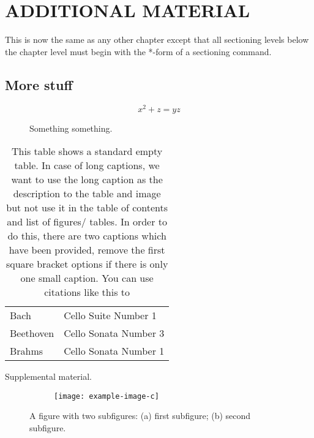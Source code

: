 

\appendixtitle
\appendix



\chapter{ADDITIONAL MATERIAL}
\finishAppendixSetup%

This is now the same as any other chapter except that
all sectioning levels below the chapter level must begin
with the *-form of a sectioning command.

\section*{More stuff}
\begin{equation}
	x^2+z=yz
\end{equation}
\begin{figure}
	\caption{Something something.}
\end{figure}
\begin{table}[h!tb] \centering
	\caption[This table shows a standard non-empty table. Please check the code caption for extended instructions]{This table shows a standard empty table. In case of long captions, we want to use the long caption as the description to the table and image but not use it in the table of contents and list of figures/ tables. In order to do this, there are two captions which have been provided, remove the first square bracket options if there is only one small caption. You can use citations like this to}
	\begin{tabular}{ll}
		Bach      & Cello Suite Number 1  \\
		Beethoven & Cello Sonata Number 3 \\
		Brahms    & Cello Sonata Number 1
	\end{tabular}
	\label{nothingagain}

	\vspace{ 2 in}
\end{table}
Supplemental material.
\begin{figure}[b]
	\begin{subfigure}[c]{0.495\textwidth}
		\centering\texttt{[image: example-image-c]}%
		\subcaption{\label{fig:2a}}
	\end{subfigure}
	\begin{subfigure}[c]{0.495\textwidth}
		\subcaption{\label{fig:2b}}%
	\end{subfigure}%
	\caption{A figure with two subfigures: (a) first subfigure; (b) second subfigure.\label{fig:2}}
\end{figure}

